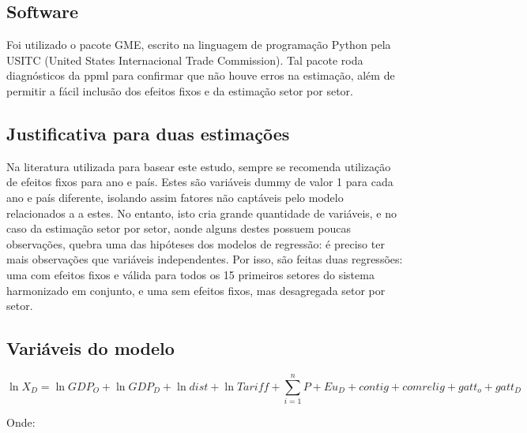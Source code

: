 \documentclass[12pt, a4paper]{article}
\begin{document}
\subsection{Software}
Foi utilizado o pacote GME, escrito na linguagem de programação Python pela USITC (United States Internacional Trade Commission). Tal pacote roda diagnósticos da ppml para confirmar que não houve erros na estimação, além de permitir a fácil inclusão dos efeitos fixos e da estimação setor por setor.

\subsection{Justificativa para duas estimações}

Na literatura utilizada para basear este estudo, sempre se recomenda utilização de efeitos fixos para ano e país. Estes são variáveis dummy de valor 1 para cada ano e país diferente, isolando assim fatores não captáveis pelo modelo relacionados a a estes. No entanto, isto cria grande quantidade de variáveis, e no caso da estimação setor por setor, aonde alguns destes possuem poucas observações, quebra uma das hipóteses dos modelos de regressão: é preciso ter mais observações que variáveis independentes. Por isso, são feitas duas regressões: uma com efeitos fixos e válida para todos os 15 primeiros setores do sistema harmonizado em conjunto, e uma sem efeitos fixos, mas desagregada setor por setor.

\subsection{Variáveis do modelo}

\begin{equation}
    \ln X_{D} = 
    \ln GDP_{O} 
    + \ln GDP_{D} 
    + \ln dist 
    + \ln Tariff 
    + \sum_{i=1}^{n} P 
    + Eu_{D} 
    + contig 
    + comrelig
    + gatt_o 
    + gatt_D
\end{equation}

Onde:
\end{document}
